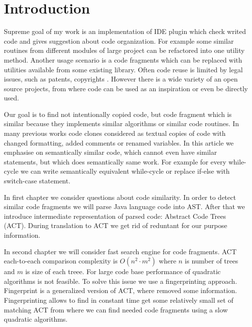 \section*{Introduction}

Supreme goal of my work is an implementation of IDE plugin which check writed code and gives suggestion about code
organization. 
For example some similar routines from different modules of large project can be refactored into one utility method.
Another usage scenario is a code fragments which can be replaced with utilities available from some existing library.
Often code reuse is limited by legal issues, such as patents, copyrights \cite{aversano07}. 
However there is a wide variety of an open source projects, from where code can be used as an inspiration or even be directly
used.

Our goal is  to find not intentionally copied code, but code fragment which is similar because they implements similar algorithms or similar code routines.
In many previous works \cite{Baxter&al1998}\cite{Kamiya:tse:00} code clones considered as textual copies of code with changed
formatting, added comments or renamed variables.
In this article we emphasise on semantically similar code, which cannot even have similar statements, but which does
semantically same work.
For example for every while-cycle we can write semantically equivalent while-cycle or replace if-else with switch-case statement.

In first chapter we consider questions about code similarity.
In order to detect similar code fragments we will parse Java language code into AST.
After that we introduce intermediate representation of parsed code: Abstract Code Trees (ACT).
During translation to ACT we get rid of reduntant for our purpose information.

In second chapter we will consider fast search engine for code fragments.
ACT each-to-each comparison complexity is $O(n^2 \cdot m^2)$ where $n$ is number of trees and $m$ is size of each treee.
For large code base performance of quadratic algorithms is not feasible.
To solve this issue we use a fingerprinting approach.
Fingerprint is a generalized version of ACT, where removed some information.
Fingerprinting allows to find in constant time get some relatively small set of matching ACT from where we can find
needed code fragments using a slow quadratic algorithms.
